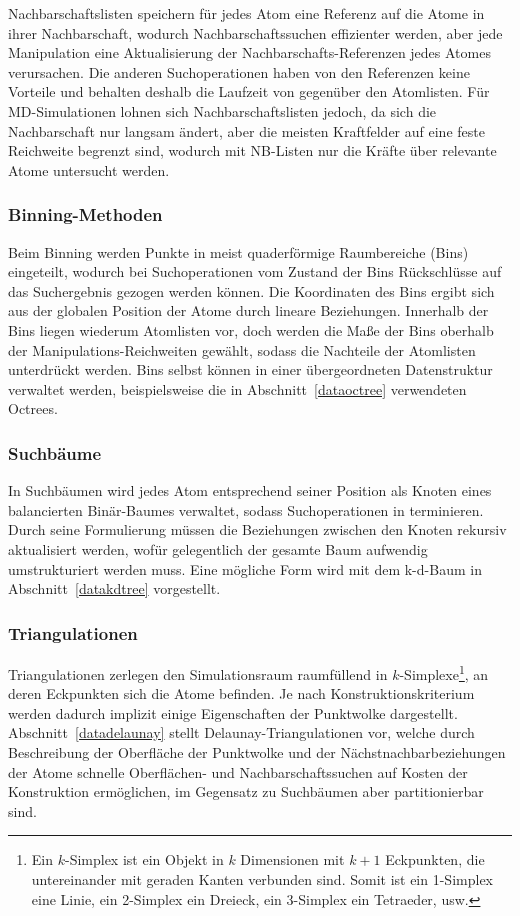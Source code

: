 Nachbarschaftslisten speichern für jedes Atom eine Referenz auf die Atome in ihrer Nachbarschaft, wodurch Nachbarschaftssuchen effizienter werden, aber jede Manipulation eine Aktualisierung der Nachbarschafts-Referenzen jedes Atomes verursachen.
Die anderen Suchoperationen haben von den Referenzen keine Vorteile und behalten deshalb die Laufzeit von  gegenüber den Atomlisten.
Für MD-Simulationen lohnen sich Nachbarschaftslisten jedoch, da sich die Nachbarschaft nur langsam ändert, aber die meisten Kraftfelder auf eine feste Reichweite begrenzt sind, wodurch mit NB-Listen nur die Kräfte über relevante Atome untersucht werden.

\subsubsection{Binning-Methoden}
Beim Binning werden Punkte in meist quaderförmige Raumbereiche (Bins) eingeteilt, wodurch bei Suchoperationen vom Zustand der Bins Rückschlüsse auf das Suchergebnis gezogen werden können.
Die Koordinaten des Bins ergibt sich aus der globalen Position der Atome durch lineare Beziehungen.
Innerhalb der Bins liegen wiederum Atomlisten vor, doch werden die Maße der Bins oberhalb der Manipulations-Reichweiten gewählt, sodass die Nachteile der Atomlisten unterdrückt werden.
Bins selbst können in einer übergeordneten Datenstruktur verwaltet werden, beispielsweise die in Abschnitt~\ref{dataoctree} verwendeten Octrees.

\subsubsection{Suchbäume}
In Suchbäumen wird jedes Atom entsprechend seiner Position als Knoten eines balancierten Binär-Baumes verwaltet, sodass Suchoperationen in  terminieren.
Durch seine Formulierung müssen die Beziehungen zwischen den Knoten rekursiv aktualisiert werden, wofür gelegentlich der gesamte Baum aufwendig umstrukturiert werden muss.
Eine mögliche Form wird mit dem k-d-Baum in Abschnitt~\ref{datakdtree} vorgestellt.

\subsubsection{Triangulationen}
Triangulationen zerlegen den Simulationsraum raumfüllend in $k$-Simplexe\footnote{Ein $k$-Simplex ist ein Objekt in $k$ Dimensionen mit $k+1$ Eckpunkten, die untereinander mit geraden Kanten verbunden sind.
  Somit ist ein 1-Simplex eine Linie, ein 2-Simplex ein Dreieck, ein 3-Simplex ein Tetraeder, usw.}, an deren Eckpunkten sich die Atome befinden.
Je nach Konstruktionskriterium werden dadurch implizit einige Eigenschaften der Punktwolke dargestellt.
Abschnitt~\ref{datadelaunay} stellt Delaunay-Triangulationen vor, welche durch Beschreibung der Oberfläche der Punktwolke und der Nächstnachbarbeziehungen der Atome schnelle Oberflächen- und Nachbarschaftssuchen auf Kosten der Konstruktion ermöglichen, im Gegensatz zu Suchbäumen aber partitionierbar sind.

